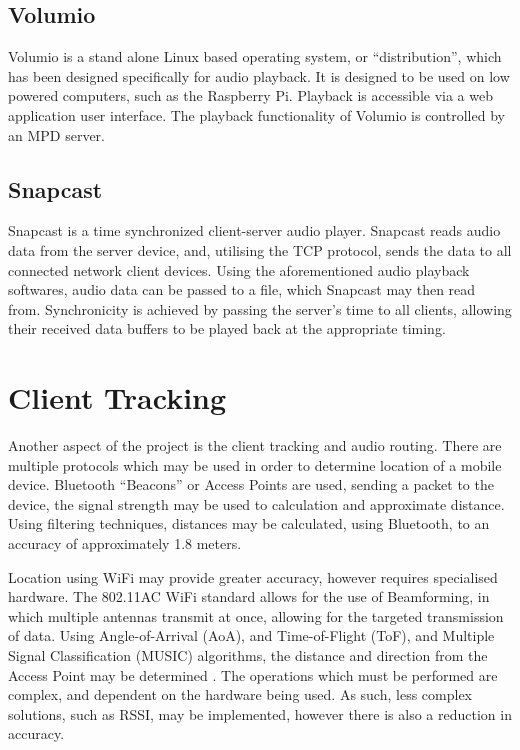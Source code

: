 \documentclass[11pt,a4paper,headinclude=false,footinclude=false]{scrreprt}
\begin{document}
\subsection{Volumio}\label{volumio}

Volumio is a stand alone Linux based operating system, or
``distribution'', which has been designed specifically for audio
playback\cite{Volumio18}. It is designed to be used on low powered
computers, such as the Raspberry Pi. Playback is accessible via a web
application user interface. The playback functionality of Volumio is
controlled by an MPD server.

\subsection{Snapcast}\label{snapcast}

Snapcast is a time synchronized client-server audio player. Snapcast
reads audio data from the server device, and, utilising the TCP
protocol, sends the data to all connected network client devices. Using
the aforementioned audio playback softwares, audio data can be passed to
a file, which Snapcast may then read from. Synchronicity is achieved by
passing the server's time to all clients, allowing their received data
buffers to be played back at the appropriate timing.

\section{Client Tracking}\label{client-tracking}

Another aspect of the project is the client tracking and audio routing.
There are multiple protocols which may be used in order to determine
location of a mobile device. Bluetooth ``Beacons'' or Access Points are
used, sending a packet to the device, the signal strength may be used to
calculation and approximate distance\cite{Park15}. Using filtering
techniques, distances may be calculated, using Bluetooth, to an accuracy
of approximately 1.8 meters\cite{Park15}.

Location using WiFi may provide greater accuracy, however requires
specialised hardware\cite{Gjengset14}. The 802.11AC WiFi standard allows
for the use of Beamforming, in which multiple antennas transmit at once,
allowing for the targeted transmission of data\cite{Heejung14}. Using
Angle-of-Arrival (AoA), and Time-of-Flight (ToF), and Multiple Signal
Classification (MUSIC) algorithms, the distance and direction from the
Access Point may be determined \cite{Afaz18}. The operations which must
be performed are complex, and dependent on the hardware being used. As
such, less complex solutions, such as RSSI, may be implemented, however
there is also a reduction in accuracy.
\end{document}
